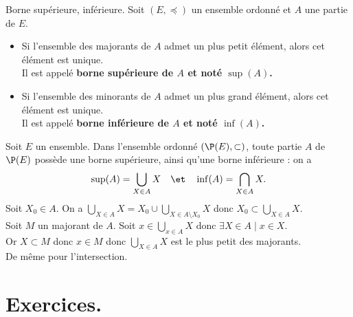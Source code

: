 \documentclass[11pt]{article}
\begin{document}
\begin{defi}{Borne supérieure, inférieure.}{}
    Soit $(E,\preceq)$ un ensemble ordonné et $A$ une partie de $E$.
    \begin{itemize}
        \item Si l'ensemble des majorants de $A$ admet un plus petit élément, alors cet élément est unique.\\
        Il est appelé \bf{borne supérieure} de $A$ et noté $\sup(A)$.
        \item Si l'ensemble des minorants de $A$ admet un plus grand élément, alors cet élément est unique.\\
        Il est appelé \bf{borne inférieure} de $A$ et noté $\inf(A)$.
    \end{itemize}
\end{defi}

\begin{ex}{}{}
    Soit $E$ un ensemble. Dans l'ensemble ordonné $(\P(E), \subset)$, toute partie $A$ de $\P(E)$ possède une borne supérieure, ainsi qu'une borne inférieure : on a
    \begin{equation*}
        \sup(A)=\bigcup_{X\in A}X \quad \et \quad \inf(A)=\bigcap_{X\in A}X.
    \end{equation*}
    \tcblower
    Soit $X_0\in A$. On a $\bigcup\limits_{X\in A}X=X_0\cup\bigcup\limits_{X\in A\setminus X_0}X$ donc $X_0 \subset \bigcup\limits_{X\in A}X$.\\
    Soit $M$ un majorant de $A$. Soit $x\in\bigcup\limits_{x\in A}X$ donc $\exists X \in A \mid x \in X$.\\
    Or $X\subset M$ donc $x\in M$ donc $\bigcup_{X\in A}X$ est le plus petit des majorants.\\
    De même pour l'intersection.
\end{ex}

\section{Exercices.}
\end{document}
